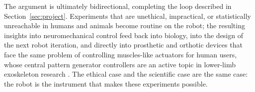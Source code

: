 The argument is ultimately bidirectional, completing the loop described in Section~\ref{sec:project}. Experiments that are unethical, impractical, or statistically unreachable in humans and animals become routine on the robot; the resulting insights into neuromechanical control feed back into biology, into the design of the next robot iteration, and directly into prosthetic and orthotic devices that face the same problem of controlling muscles-like actuators for human users, whose central pattern generator controllers are an active topic in lower-limb exoskeleton research \citep{duan_gait_2024, pery_benchmarking_2026}. The ethical case and the scientific case are the same case: the robot is the instrument that makes these experiments possible.
